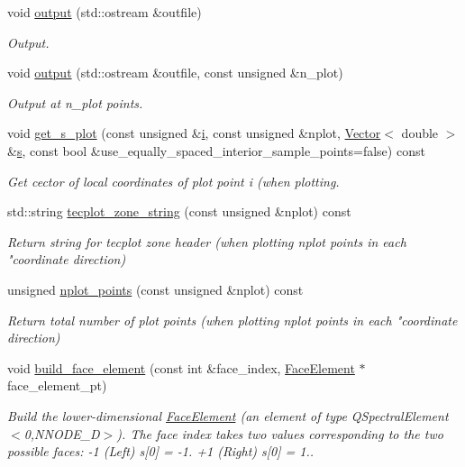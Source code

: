 \begin{DoxyCompactItemize}
void \hyperlink{classoomph_1_1QSpectralElement_3_011_00_01NNODE__1D_01_4_a20b741c9b2523979612d2b63b3b05006}{output} (std\+::ostream \&outfile)
\begin{DoxyCompactList}\small\item\em Output. \end{DoxyCompactList}\item 
void \hyperlink{classoomph_1_1QSpectralElement_3_011_00_01NNODE__1D_01_4_a8951704e35bc73c46e22554c75821803}{output} (std\+::ostream \&outfile, const unsigned \&n\+\_\+plot)
\begin{DoxyCompactList}\small\item\em Output at n\+\_\+plot points. \end{DoxyCompactList}\item 
void \hyperlink{classoomph_1_1QSpectralElement_3_011_00_01NNODE__1D_01_4_aea5a330832dea0920a948660745e6f01}{get\+\_\+s\+\_\+plot} (const unsigned \&\hyperlink{cfortran_8h_adb50e893b86b3e55e751a42eab3cba82}{i}, const unsigned \&nplot, \hyperlink{classoomph_1_1Vector}{Vector}$<$ double $>$ \&\hyperlink{cfortran_8h_ab7123126e4885ef647dd9c6e3807a21c}{s}, const bool \&use\+\_\+equally\+\_\+spaced\+\_\+interior\+\_\+sample\+\_\+points=false) const
\begin{DoxyCompactList}\small\item\em Get cector of local coordinates of plot point i (when plotting. \end{DoxyCompactList}\item 
std\+::string \hyperlink{classoomph_1_1QSpectralElement_3_011_00_01NNODE__1D_01_4_a250b5613ab76f43d9cd67dc01b8eb8fe}{tecplot\+\_\+zone\+\_\+string} (const unsigned \&nplot) const
\begin{DoxyCompactList}\small\item\em Return string for tecplot zone header (when plotting nplot points in each "coordinate direction) \end{DoxyCompactList}\item 
unsigned \hyperlink{classoomph_1_1QSpectralElement_3_011_00_01NNODE__1D_01_4_a5f590bfd5cc59a282f970a8853ad0008}{nplot\+\_\+points} (const unsigned \&nplot) const
\begin{DoxyCompactList}\small\item\em Return total number of plot points (when plotting nplot points in each "coordinate direction) \end{DoxyCompactList}\item 
void \hyperlink{classoomph_1_1QSpectralElement_3_011_00_01NNODE__1D_01_4_a76bd974ec87daaecdb4b629b6de7beb3}{build\+\_\+face\+\_\+element} (const int \&face\+\_\+index, \hyperlink{classoomph_1_1FaceElement}{Face\+Element} $\ast$face\+\_\+element\+\_\+pt)
\begin{DoxyCompactList}\small\item\em Build the lower-\/dimensional \hyperlink{classoomph_1_1FaceElement}{Face\+Element} (an element of type Q\+Spectral\+Element$<$0,\+N\+N\+O\+D\+E\+\_\+D$>$). The face index takes two values corresponding to the two possible faces\+: -\/1 (Left) s\mbox{[}0\mbox{]} = -\/1. +1 (Right) s\mbox{[}0\mbox{]} = 1.. \end{DoxyCompactList}\end{DoxyCompactItemize}
